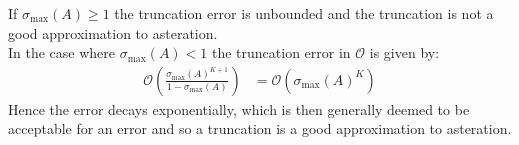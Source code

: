 \documentclass[a4paper,12pt]{ETHexercise}
\begin{document}
\begin{question}
\begin{subquestion}
		If $\sigma_{\text{max}}(A) \geq 1$ the truncation error is unbounded and the truncation is not a good approximation to asteration.\\
		In the case where $\sigma_{\text{max}}(A) < 1$ the truncation error in $\mathcal{O}$ is given by:
		\begin{align}
			\mathcal{O}\left( \frac{\sigma_{\text{max}}(A)^{K+1}}{1 - \sigma_{\text{max}}(A)} \right) & = \mathcal{O} \left( \sigma_{\text{max}}(A)^K \right)
		\end{align}
		Hence the error decays exponentially, which is then generally deemed to be acceptable for an error and so a truncation is a good approximation to asteration.
	\end{subquestion}
\end{question}
\end{document}
